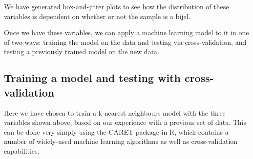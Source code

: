 \documentclass{article}\usepackage[]{graphicx}\usepackage[]{color}
\begin{document}
We have generated box-and-jitter plots to see how the distribution of these variables is dependent on whether or not the sample is a bijel.

Once we have these variables, we can apply a machine learning model to it in one of two ways: training the model on the data and testing via cross-validation, and testing a previously trained model on the new data.

\subsection{Training a model and testing with cross-validation}
Here we have chosen to train a k-nearest neighbours model with the three variables shown above, based on our experience with a previous set of data. This can be done very simply using the CARET package in R, which contains a number of widely-used machine learning algorithms as well as cross-validation capabilities. 
\end{document}
